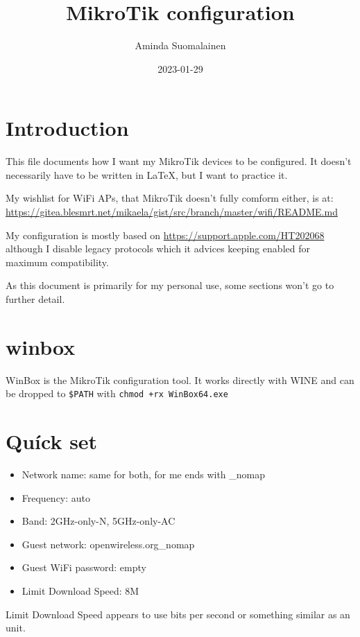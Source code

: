 \documentclass[a4paper,colorlinks,linkcolor=blue]{rapport3}
\title{MikroTik configuration}
\author{Aminda Suomalainen}
\date{2023-01-29}
\begin{document}
\hypersetup{urlcolor=blue}
\maketitle
\tableofcontents

\chapter{Introduction}

This file documents how I want my MikroTik devices to be configured.
It doesn't necessarily have to be written in \LaTeX, but I want to practice it.

My wishlist for WiFi APs, that MikroTik doesn't fully comform either, is at:
\url{https://gitea.blesmrt.net/mikaela/gist/src/branch/master/wifi/README.md}

My configuration is mostly based on \url{https://support.apple.com/HT202068} although I disable legacy protocols which it advices keeping enabled for maximum compatibility.

As this document is primarily for my personal use, some sections won't go to further detail.

\chapter{winbox}

WinBox is the MikroTik configuration tool.
It works directly with WINE and can be dropped to \texttt{\$PATH} with \texttt{chmod +rx WinBox64.exe}

\chapter{Quíck set}

\begin{itemize}
    \item Network name: same for both, for me ends with \_nomap
    \item Frequency: auto
    \item Band: 2GHz-only-N, 5GHz-only-AC
    \item Guest network: openwireless.org\_nomap
    \item Guest WiFi password: empty
    \item Limit Download Speed: 8M
\end{itemize}

Limit Download Speed appears to use bits per second or something similar as an unit.
\end{document}
